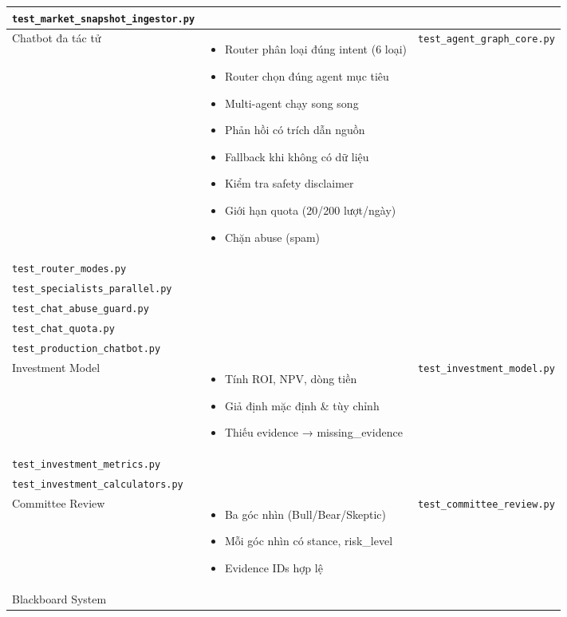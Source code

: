 \begin{longtable}{|p{3.5cm}|p{5cm}|p{5cm}|}
    \texttt{test\_market\_snapshot\_ingestor.py} \\
    \hline
    Chatbot đa tác tử & 
    \begin{itemize}
        \item Router phân loại đúng intent (6 loại)
        \item Router chọn đúng agent mục tiêu
        \item Multi-agent chạy song song
        \item Phản hồi có trích dẫn nguồn
        \item Fallback khi không có dữ liệu
        \item Kiểm tra safety disclaimer
        \item Giới hạn quota (20/200 lượt/ngày)
        \item Chặn abuse (spam)
    \end{itemize} & 
    \texttt{test\_agent\_graph\_core.py} \\
    \texttt{test\_router\_modes.py} \\
    \texttt{test\_specialists\_parallel.py} \\
    \texttt{test\_chat\_abuse\_guard.py} \\
    \texttt{test\_chat\_quota.py} \\
    \texttt{test\_production\_chatbot.py} \\
    \hline
    Investment Model & 
    \begin{itemize}
        \item Tính ROI, NPV, dòng tiền
        \item Giả định mặc định \& tùy chỉnh
        \item Thiếu evidence → missing\_evidence
    \end{itemize} & 
    \texttt{test\_investment\_model.py} \\
    \texttt{test\_investment\_metrics.py} \\
    \texttt{test\_investment\_calculators.py} \\
    \hline
    Committee Review & 
    \begin{itemize}
        \item Ba góc nhìn (Bull/Bear/Skeptic)
        \item Mỗi góc nhìn có stance, risk\_level
        \item Evidence IDs hợp lệ
    \end{itemize} & 
    \texttt{test\_committee\_review.py} \\
    \hline
    Blackboard System & 

\end{longtable}
